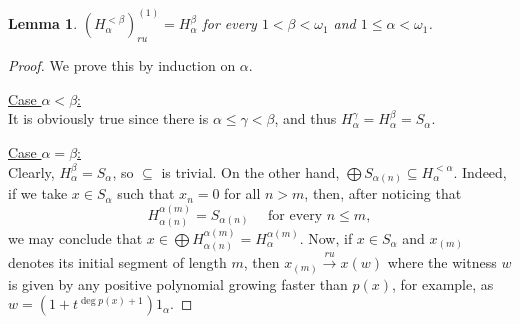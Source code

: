 \documentclass[10pt]{article}
\newtheorem{lemma}{Lemma}[section]
\renewcommand{\a}{\alpha}
\renewcommand{\b}{\beta}
\newcommand{\g}{\gamma}
\newcommand{\w}{\omega}
\begin{document}
\begin{lemma}\label{H_is_closed}
$ (H_\a^{<\b})_{ru}^{(1)} = H_\a^\b $ for every $ 1 < \b < \w_1 $ and $ 1 \leqslant \a < \w_1 $.
\end{lemma}

\begin{proof}
We prove this by induction on $ \alpha $.

\medskip\noindent
\underline{Case $ \a < \b $:}\\
It is obviously true since there is $ \a \leqslant \g < \b $, and thus $ H_\a^\g = H_\a^\b = S_\a $.

\medskip\noindent
\underline{Case $ \a = \b $:}\\
Clearly, $ H_\a^\b = S_\a $, so $ \subseteq $ is trivial.
On the other hand, $ \bigoplus S_{\a(n)} \subseteq H_\a^{<\a} $. Indeed, if we take $ x \in S_\a $ such that $ x_n = 0 $ for all $ n > m $, then, after noticing that
$$
	H_{\a(n)}^{\a(m)} = S_{\a(n)} \quad\text{ for every } n \leqslant m,
$$
we may conclude that $ x \in \bigoplus H_{\a(n)}^{\a(m)} = H_\a^{\a(m)} $.
Now, if $ x \in S_\a $ and $ x_{(m)} $ denotes its initial segment of length $ m $, then $ x_{(m)}\overset{ru}{\rightarrow} x (w) $ 
where the witness $ w $ is given by any positive polynomial growing faster than $ p(x) $, for example, as $ w = (1+t^{\deg p(x) + 1})1_\a $.


\end{proof}
\end{document}
